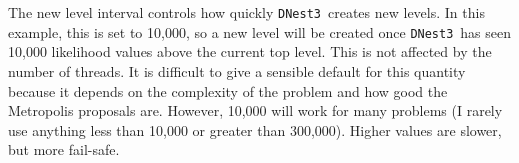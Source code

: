 \documentclass[a4paper, 11pt]{article}
\newcommand{\dnest}{{\tt DNest3}}
\begin{document}
The new level interval controls how quickly \dnest~creates new levels. In this
example, this is set to 10,000, so a new level will be created once \dnest~has
seen 10,000 likelihood values above the current top level. This is not affected by
the number of threads. It is difficult to give a sensible default for this
quantity because it depends on the complexity of the problem and how good
the Metropolis proposals are. However, 10,000
will work for many problems (I rarely use anything less than 10,000 or greater
than 300,000). Higher values are slower, but more fail-safe.

\end{document}
